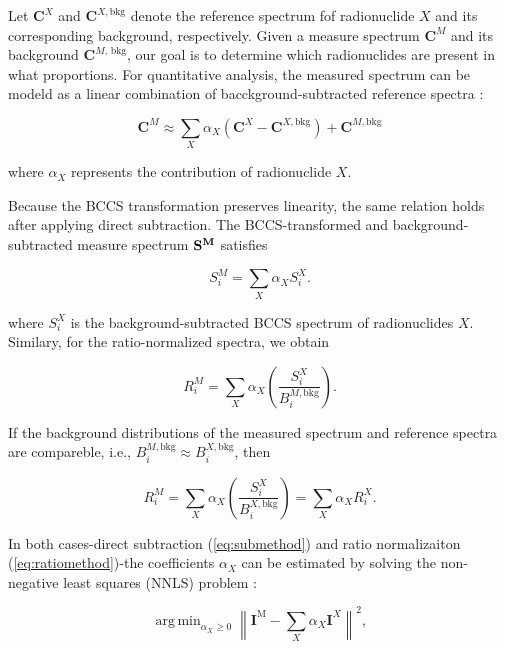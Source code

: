 \documentclass[10pt]{wlscirep}
\DeclareMathOperator*{\argmin}{arg\,min} %
\begin{document}
Let $\textbf{C}^X$ and $\textbf{C}^{X,\text{bkg}}$ denote the reference spectrum fof radionuclide $X$ and its corresponding background, respectively. Given a measure spectrum $\textbf{C}^M$ and its background $\textbf{C}^{M,\,\text{bkg}}$, our goal is to determine which radionuclides are present in what proportions. For quantitative analysis, the measured spectrum can be modeld as a linear combination of bacckground-subtracted reference spectra :



\begin{equation}
\textbf{C}^M \approx \sum_{X} \alpha_X (\textbf{C}^{X} - \textbf{C}^{X,\text{bkg}}) + \textbf{C}^{M,\textrm{bkg}}
\end{equation}

\noindent where $\alpha_X$ represents the contribution of radionuclide $X$. 

Because the BCCS transformation preserves linearity, the same relation holds after applying direct subtraction. The BCCS-transformed and background-subtracted measure spectrum $\bf{S}^M$ satisfies

\begin{equation}
S_i^M = \sum_X \alpha_X S_i^X.\label{eq:submethod}
\end{equation}

where $S^X_i$ is the background-subtracted BCCS spectrum of radionuclides $X$. Similary, for the ratio-normalized spectra, we obtain

\begin{equation*}
R_i^M = \sum_X \alpha_X \left(\dfrac{S_i^X}{B_i^{M,\text{bkg}}}\right).
\end{equation*}

If the background distributions of the measured spectrum and reference spectra are compareble, i.e., $B^{M,\text{bkg}}_i \approx B_i^{X,\text{bkg}}$, then

\begin{equation}
R_i^M = \sum_X \alpha_X \left(\dfrac{S_i^X}{B_i^{X,\text{bkg}}}\right) = \sum_X \alpha_X R_i^X.\label{eq:ratiomethod}
\end{equation}

In both cases-direct subtraction (\ref{eq:submethod}) and ratio normalizaiton (\ref{eq:ratiomethod})-the coefficients $\alpha_X$ can be estimated by solving the non-negative least squares (NNLS) problem :

\begin{equation}
\argmin_{\alpha_X \ge 0} \left\| \textbf{I}^{\text{M}} - \sum_{X} \alpha_X \textbf{I}^{X}\right\|^2,
\end{equation}
\end{document}

